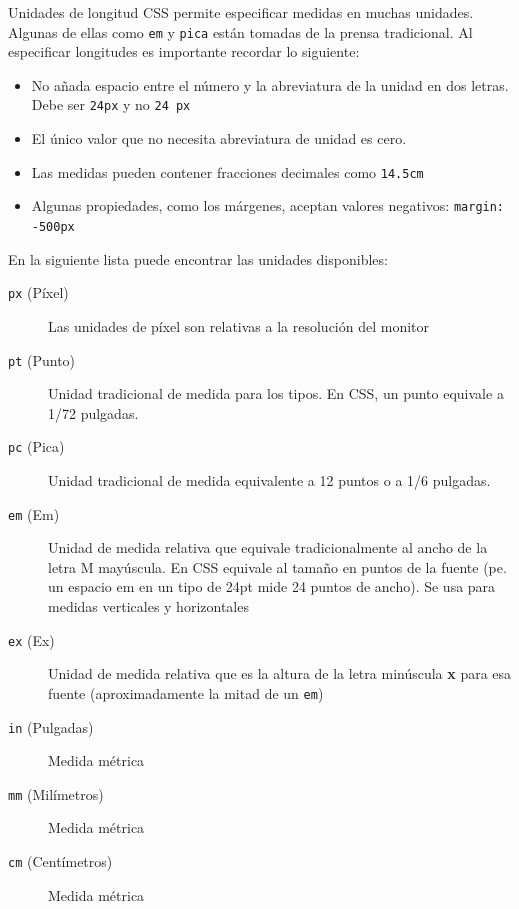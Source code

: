 \begin{frame}[allowframebreaks]{Unidades de longitud} %
    CSS permite especificar medidas en muchas unidades. Algunas de ellas como
    \texttt{em} y \texttt{pica} están tomadas de la prensa tradicional. Al
    especificar longitudes es importante recordar lo siguiente: 

    \begin{itemize}
        \item No añada espacio entre el número y la abreviatura de la unidad en
        dos letras. Debe ser \texttt{24px} y no \texttt{24 px}
        \item El único valor que no necesita abreviatura de unidad es cero. 
        \item Las medidas pueden contener fracciones decimales como
        \texttt{14.5cm}
        \item Algunas propiedades, como los márgenes, aceptan valores
        negativos: \texttt{margin: -500px}
    \end{itemize}

    En la siguiente lista puede encontrar las unidades disponibles:
    \begin{description}
        \item[\texttt{px} (Píxel)] Las unidades de píxel son relativas a la resolución
        del monitor
        \item[\texttt{pt} (Punto)] Unidad tradicional de medida para los tipos. En CSS,
        un punto equivale a 1/72 pulgadas.
        \item[\texttt{pc} (Pica)] Unidad tradicional de medida equivalente a 12
        puntos o a 1/6 pulgadas.
        \item[\texttt{em} (Em)] Unidad de medida relativa que equivale
        tradicionalmente al ancho de la letra M mayúscula. En CSS equivale al
        tamaño en puntos de la fuente (pe. un espacio em en un tipo de 24pt
        mide 24 puntos de ancho). Se usa para medidas verticales y horizontales
        \item[\texttt{ex} (Ex)] Unidad de medida relativa que es la altura de
        la letra minúscula \textbf{x} para esa fuente (aproximadamente la mitad
        de un \texttt{em})
        \item[\texttt{in} (Pulgadas)] Medida métrica
        \item[\texttt{mm} (Milímetros)] Medida métrica
        \item[\texttt{cm} (Centímetros)] Medida métrica
    \end{description}
\end{frame}

